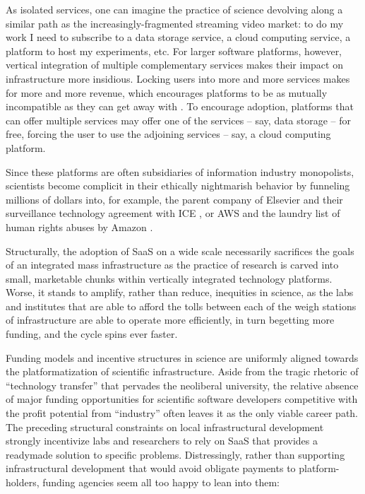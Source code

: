 \documentclass[11pt]{article}
\begin{document}
\begin{multicols}{2}
As isolated services, one can imagine the practice of science devolving
along a similar path as the increasingly-fragmented streaming video
market: to do my work I need to subscribe to a data storage service, a
cloud computing service, a platform to host my experiments, etc. For
larger software platforms, however, vertical integration of multiple
complementary services makes their impact on infrastructure more
insidious. Locking users into more and more services makes for more and
more revenue, which encourages platforms to be as mutually incompatible
as they can get away with \cite{macinnesCompatibilityStandardsMonopoly2005} . To encourage adoption,
platforms that can offer multiple services may offer one of the services
-- say, data storage -- for free, forcing the user to use the adjoining
services -- say, a cloud computing platform.

Since these platforms are often subsidiaries of information industry
monopolists, scientists become complicit in their ethically nightmarish
behavior by funneling millions of dollars into, for example, the parent
company of Elsevier and their surveillance technology agreement with ICE
\cite{biddleLexisNexisProvideGiant2021} , or AWS and the laundry
list of human rights abuses by Amazon \cite{CriticismAmazon2021} .

Structurally, the adoption of SaaS on a wide scale necessarily
sacrifices the goals of an integrated mass infrastructure as the
practice of research is carved into small, marketable chunks within
vertically integrated technology platforms. Worse, it stands to amplify,
rather than reduce, inequities in science, as the labs and institutes
that are able to afford the tolls between each of the weigh stations of
infrastructure are able to operate more efficiently, in turn begetting
more funding, and the cycle spins ever faster.

Funding models and incentive structures in science are uniformly aligned
towards the platformatization of scientific infrastructure. Aside from
the tragic rhetoric of ``technology transfer'' that pervades the
neoliberal university, the relative absence of major funding
opportunities for scientific software developers competitive with the
profit potential from ``industry'' often leaves it as the only viable
career path. The preceding structural constraints on local
infrastructural development strongly incentivize labs and researchers to
rely on SaaS that provides a readymade solution to specific problems.
Distressingly, rather than supporting infrastructural development that
would avoid obligate payments to platform-holders, funding agencies seem
all too happy to lean into them:


\end{multicols}
\end{document}
